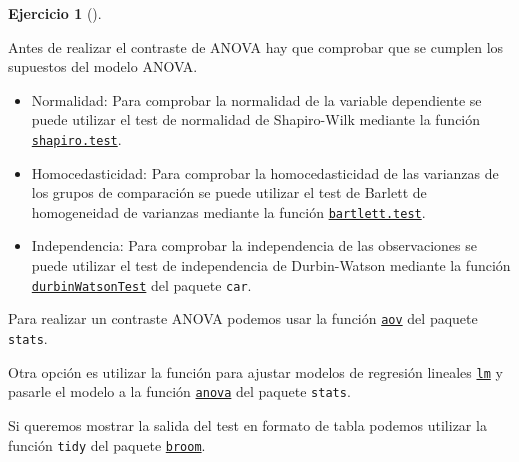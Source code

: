 \documentclass[
  a4paper,
]{scrreport}
\providecommand{\tightlist}{%
  \setlength{\itemsep}{0pt}\setlength{\parskip}{0pt}}\usepackage{longtable,booktabs,array}
\theoremstyle{definition}
\newtheorem{exercise}{Ejercicio}[chapter]
\theoremstyle{remark}
\begin{document}
\begin{exercise}[]
\begin{enumerate}
\begin{tcolorbox}
  Antes de realizar el contraste de ANOVA hay que comprobar que se
  cumplen los supuestos del modelo ANOVA.

  \begin{itemize}
  \tightlist
  \item
    Normalidad: Para comprobar la normalidad de la variable dependiente
    se puede utilizar el test de normalidad de Shapiro-Wilk mediante la
    función
    \href{https://www.rdocumentation.org/packages/stats/versions/3.6.2/topics/shapiro.test}{\texttt{shapiro.test}}.
  \item
    Homocedasticidad: Para comprobar la homocedasticidad de las
    varianzas de los grupos de comparación se puede utilizar el test de
    Barlett de homogeneidad de varianzas mediante la función
    \href{https://www.rdocumentation.org/packages/stats/versions/3.6.2/topics/bartlett.test}{\texttt{bartlett.test}}.
  \item
    Independencia: Para comprobar la independencia de las observaciones
    se puede utilizar el test de independencia de Durbin-Watson mediante
    la función
    \href{https://www.rdocumentation.org/packages/car/versions/3.1-2/topics/durbinWatsonTest}{\texttt{durbinWatsonTest}}
    del paquete \texttt{car}.
  \end{itemize}

  Para realizar un contraste ANOVA podemos usar la función
  \href{https://rdrr.io/r/stats/aov.html}{\texttt{aov}} del paquete
  \texttt{stats}.

  Otra opción es utilizar la función para ajustar modelos de regresión
  lineales
  \href{https://www.rdocumentation.org/packages/stats/versions/3.6.2/topics/lm}{\texttt{lm}}
  y pasarle el modelo a la función
  \href{https://rdrr.io/r/stats/anova.html}{\texttt{anova}} del paquete
  \texttt{stats}.

  Si queremos mostrar la salida del test en formato de tabla podemos
  utilizar la función \texttt{tidy} del paquete
  \href{https://broom.tidymodels.org/index.html}{\texttt{broom}}.

  \end{tcolorbox}

  \begin{tcolorbox}[enhanced jigsaw, colframe=quarto-callout-tip-color-frame, toprule=.15mm, bottomtitle=1mm, breakable, opacitybacktitle=0.6, toptitle=1mm, colback=white, bottomrule=.15mm, title=\textcolor{quarto-callout-tip-color}{\faLightbulb}\hspace{0.5em}{Solución}, arc=.35mm, left=2mm, titlerule=0mm, rightrule=.15mm, coltitle=black, leftrule=.75mm, opacityback=0, colbacktitle=quarto-callout-tip-color!10!white]


\end{tcolorbox}
\end{enumerate}
\end{exercise}
\end{document}
